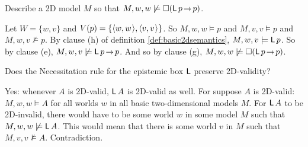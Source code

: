 
\begin{exercise}
  Describe a 2D model $M$ so that $M,w,w \not\models \Box(\apriori p \to p)$.
\end{exercise}
\begin{solution}
  Let $W = \{ w,v \}$ and $V(p) = \{ \t{w,w}, \t{v,v} \}$. So $M,w,w \models p$ and $M,v,v \models p$ and $M,w,v \not\models p$. By clause (h) of definition \ref{def:basic2dsemantics}, $M,w,v \models \apriori p$. So by clause (e), $M,w,v \not\models \apriori p \to p$. And so by clause (g), $M,w,w \not\models \Box(\apriori p \to p)$.
\end{solution}

\begin{exercise}
  Does the Necessitation rule for the epistemic box $\operatorname{\mathsf{L}}$ preserve 2D-validity?
\end{exercise}
\begin{solution}
  Yes: whenever $A$ is 2D-valid, $\operatorname{\mathsf{L}} A$ is 2D-valid as well.
  For suppose $A$ is 2D-valid:
  $M,w,w \models A$ for all worlds $w$ in all basic two-dimensional models $M$.
  For $\operatorname{\mathsf{L}} A$ to be 2D-invalid,
  there would have to be some world $w$ in some model $M$ such that $M,w,w \not\models \apriori A$.
  This would mean that there is some world $v$ in $M$ such that $M,v,v \not\models A$.
  Contradiction.
\end{solution}




